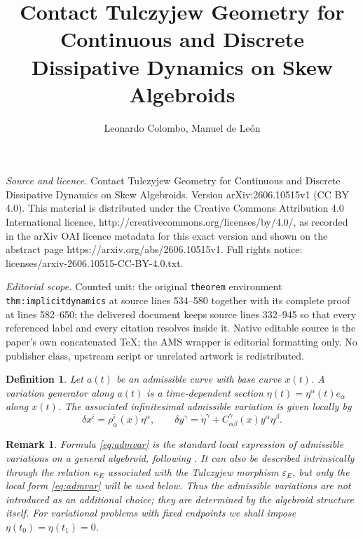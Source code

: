 \documentclass[10pt,a4paper]{amsart}
\newtheorem{definition}[theorem]{Definition}
\newtheorem{remark}[theorem]{Remark}
\begin{document}
\title[Contact Tulczyjew Geometry for Continuous and Discrete Dissi]{Contact Tulczyjew Geometry for Continuous and Discrete Dissipative Dynamics on Skew Algebroids}
\author{Leonardo Colombo, Manuel de León}
\date{}
\maketitle
\noindent\emph{Source and licence.} Contact Tulczyjew Geometry for Continuous and Discrete Dissipative Dynamics on Skew Algebroids. Version arXiv:2606.10515v1 (CC BY 4.0). This material is distributed under the Creative Commons Attribution 4.0 International licence, http://creativecommons.org/licenses/by/4.0/, as recorded in the arXiv OAI licence metadata for this exact version and shown on the abstract page https://arxiv.org/abs/2606.10515v1. Full rights notice: licenses/arxiv-2606.10515-CC-BY-4.0.txt.\par\smallskip
\noindent\textit{Editorial scope.} Counted unit: the original \texttt{theorem} environment \texttt{thm:implicitdynamics} at source lines 534--580 together with its complete proof at lines 582--650; the delivered document keeps source lines 332--945 so that every referenced label and every citation resolves inside it. Native editable source is the paper's own concatenated TeX; the AMS wrapper is editorial formatting only. No publisher class, upstream script or unrelated artwork is redistributed.
\begin{definition}\label{var}
Let \(a(t)\) be an admissible curve with base curve \(x(t)\). A
\emph{variation generator} along \(a(t)\) is a time-dependent section $\eta(t)=\eta^\alpha(t)e_\alpha$ along \(x(t)\). The associated infinitesimal admissible variation is given
locally by
\begin{equation}
        \delta x^i
        =
        \rho^i_{\alpha}(x)\eta^\alpha,
        \qquad
        \delta y^\gamma
        =
        \dot\eta^\gamma
        +
        C^\gamma_{\alpha\beta}(x)y^\alpha\eta^\beta .
\label{eq:admvar}
\end{equation}
\end{definition}

\begin{remark}
Formula \eqref{eq:admvar} is the standard local expression of admissible variations
on a general algebroid, following \cite{GG2008}.
It can also be described intrinsically through the relation $\kappa_E$
associated with the Tulczyjew morphism $\varepsilon_E$, but only the
local form \eqref{eq:admvar} will be used below. Thus the admissible
variations are not introduced as an additional choice; they are determined by the algebroid structure itself. For variational problems with fixed
endpoints we shall impose $\eta(t_0)=\eta(t_1)=0$.
\end{remark}
\end{document}
